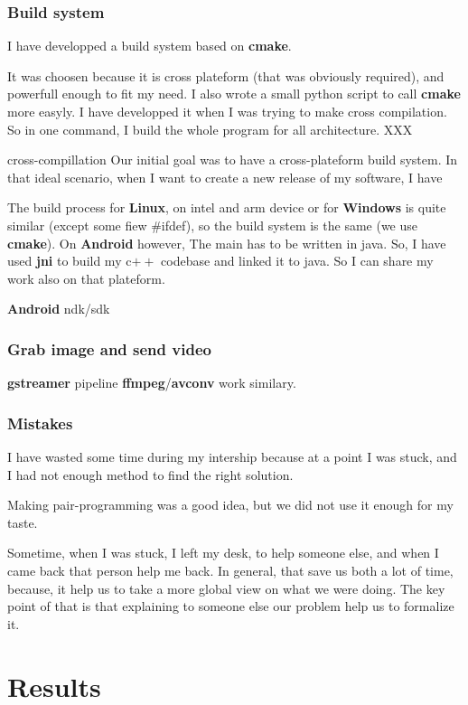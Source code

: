\documentclass[a4paper,11pt]{custom}
\newcommand{\avconv}{\textbf{avconv}}
\newcommand{\ffmpeg}{\textbf{ffmpeg}}
\newcommand{\gstreamer}{\textbf{gstreamer}}
\newcommand{\cmake}{\textbf{cmake}}
\newcommand{\jni}{\textbf{jni}}
\newcommand{\linux}{\textbf{Linux}}
\newcommand{\win}{\textbf{Windows}}
\newcommand{\android}{\textbf{Android}}
\newcommand{\cpp}{c$++$}
\begin{document}
\subsection{Build system}

I have developped a build system based on \cmake.

It was choosen because it is
cross plateform (that was obviously required), and powerfull enough to fit my
need. I also wrote a small python script to call \cmake{} more easyly. I have
developped it when I was trying to make cross compilation. So in one command, I
build the whole program for all architecture. XXX

cross-compillation
Our initial goal was to have a cross-plateform build system. In that ideal
scenario, when I want to create a new release of my software, I have

The build process for \linux, on intel and arm device or for \win{} is quite
similar (except some fiew \#ifdef), so the build system is the same (we use
\cmake). On \android{} however, The main has to be written in java. So, I have
used \jni{} to build my \cpp{} codebase and linked it to java. So I can share my
work also on that plateform.

\android{} ndk/sdk

\subsection{Grab image and send video}

\gstreamer{} pipeline
\ffmpeg/\avconv{} work similary.

\subsection{Mistakes}

I have wasted some time during my intership because at a point I was stuck, and
I had not enough method to find the right solution.

Making pair-programming was a good idea, but we did not use it enough for my
taste.

Sometime, when I was stuck, I left my desk, to help someone else, and when I
came back that person help me back. In general, that save us both a lot of time,
because, it help us to take a more global view on what we were doing. The key
point of that is that explaining to someone else our problem help us to
formalize it.

\chapter{Results}
\end{document}
